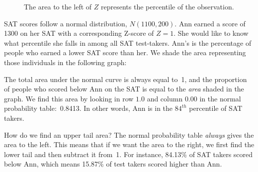 \begin{figure}[h]
  \centering
  \caption{The area to the left of $Z$ represents the
      percentile of the observation.}
\end{figure}

\begin{examplewrap}
\begin{nexample}{
    SAT scores follow a normal distribution, $N(1100, 200)$.
    Ann earned a score of 1300 on her SAT with
    a corresponding Z-score of $Z = 1$.
    She would like to know what percentile she falls in among
    all SAT test-takers.}
  Ann's  is the percentage of people who
  earned a lower SAT score than her.
  We shade the area representing those individuals in the
  following graph:
  \begin{center}
  \end{center}
  The total area under the normal curve is always equal to~1,
  and the proportion of people who scored below Ann on the SAT
  is equal to the \emph{area} shaded in the graph.
  We find this area by looking in row $1.0$ and column $0.00$
  in the normal probability table:~0.8413.
  In other words, Ann is in the $84^{th}$ percentile of
  SAT takers.
\end{nexample}
\end{examplewrap}

\begin{examplewrap}
\begin{nexample}{How do we find an upper tail area?}
  The normal probability table \emph{always} gives the area
  to the left.
  This means that if we want the area to the right,
  we first find the lower tail and then subtract it from~1.
  For instance, 84.13\% of SAT takers scored below Ann,
  which means 15.87\% of test takers scored higher than Ann.
\end{nexample}
\end{examplewrap}

